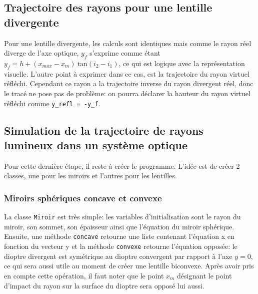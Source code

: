 \documentclass[a4paper,11pt]{article}
\begin{document}
\subsection{Trajectoire des rayons pour une lentille divergente}
Pour une lentille divergente, les calculs sont identiques mais comme le rayon réel diverge de l'axe optique, $y_f$ s'exprime comme étant $y_f = h + (x_{max} - x_m) \: \text{tan} (i_2 - i_1)$, ce qui est logique avec la représentation visuelle. L'autre point à exprimer dans ce cas, est la trajectoire du rayon virtuel réfléchi. Cependant ce rayon a la trajectoire inverse du rayon divergent réel, donc le tracé ne pose pas de problème: on pourra déclarer la hauteur du rayon virtuel réfléchi comme \verb|y_refl = -y_f|.

\subsection{Simulation de la trajectoire de rayons lumineux dans un système optique}
Pour cette dernière étape, il reste à créer le programme. L'idée est de créer 2 classes, une pour les miroirs et l'autres pour les lentilles. 

\subsubsection{Miroirs sphériques concave et convexe}
La classe \verb|Miroir| est très simple: les variables d'initialisation sont le rayon du miroir, son sommet, son épaisseur ainsi que l'équation du miroir sphérique. Ensuite, une méthode \verb|concave| retourne une liste contenant l'équation x en fonction du vecteur y et la méthode \verb|convexe| retourne l'équation opposée: le dioptre divergent est symétrique au dioptre convergent par rapport à l'axe $y=0$, ce qui sera aussi utile au moment de créer une lentille biconvexe. Après avoir pris en compte cette opération, il faut noter que le point $x_m$ désignant le point d'impact du rayon sur la surface du dioptre sera opposé lui aussi.
\end{document}
